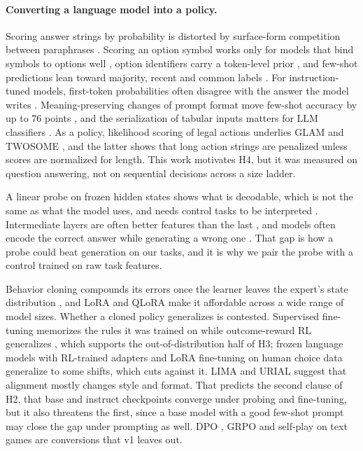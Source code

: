 \paragraph{Converting a language model into a policy.}
Scoring answer strings by probability is distorted by surface-form competition between paraphrases \citep{holtzman2021surface}. Scoring an option symbol works only for models that bind symbols to options well \citep{robinson2023mcsb}, option identifiers carry a token-level prior \citep{zheng2024selectors}, and few-shot predictions lean toward majority, recent and common labels \citep{zhao2021calibrate}. For instruction-tuned models, first-token probabilities often disagree with the answer the model writes \citep{wang2024myanswerc}. Meaning-preserving changes of prompt format move few-shot accuracy by up to 76 points \citep{sclar2024formatting}, and the serialization of tabular inputs matters for LLM classifiers \citep{hegselmann2023tabllm}. As a policy, likelihood scoring of legal actions underlies GLAM \citep{carta2023glam} and TWOSOME \citep{tan2024twosome}, and the latter shows that long action strings are penalized unless scores are normalized for length. This work motivates H4, but it was measured on question answering, not on sequential decisions across a size ladder.

A linear probe on frozen hidden states shows what is decodable, which is not the same as what the model uses, and needs control tasks to be interpreted \citep{belinkov2022probing}. Intermediate layers are often better features than the last \citep{skean2025layer}, and models often encode the correct answer while generating a wrong one \citep{orgad2025know}. That gap is how a probe could beat generation on our tasks, and it is why we pair the probe with a control trained on raw task features.

Behavior cloning \citep{pomerleau1988alvinn} compounds its errors once the learner leaves the expert's state distribution \citep{ross2011dagger}, and LoRA \citep{hu2022lora} and QLoRA \citep{dettmers2023qlora} make it affordable across a wide range of model sizes. Whether a cloned policy generalizes is contested. Supervised fine-tuning memorizes the rules it was trained on while outcome-reward RL generalizes \citep{chu2025sft}, which supports the out-of-distribution half of H3; frozen language models with RL-trained adapters \citep{szot2024llarp} and LoRA fine-tuning on human choice data \citep{binz2025centaur} generalize to some shifts, which cuts against it. LIMA \citep{zhou2023lima} and URIAL \citep{lin2024urial} suggest that alignment mostly changes style and format. That predicts the second clause of H2, that base and instruct checkpoints converge under probing and fine-tuning, but it also threatens the first, since a base model with a good few-shot prompt may close the gap under prompting as well. DPO \citep{rafailov2023dpo}, GRPO \citep{shao2024deepseekmath} and self-play on text games \citep{liu2026spiral} are conversions that \deadeye{} v1 leaves out.


